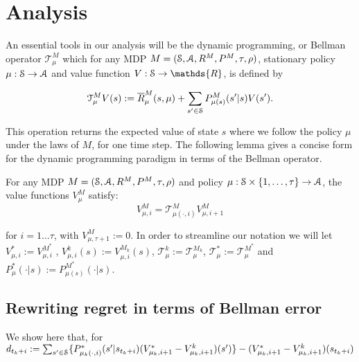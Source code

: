 \section{Analysis}

An essential tools in our analysis will be the dynamic programming, or Bellman operator $\mathcal{T}_{\mu}^{M}$ which for any MDP $M = (\mathcal{S}, \mathcal{A}, R^M, P^M, \tau, \rho)$, stationary policy $\mu:\mathcal{S} \rightarrow \mathcal{A}$ and value function $V:\states \rightarrow \mathds{R}$, is defined by

$$\mathcal{T}_{\mu}^{M} V(s) := \overline{R}_{\mu}^{M} (s, \mu) + \sum_{s' \in \mathcal{S}} P_{\mu(s)}^{M}(s' | s) V(s').$$

This operation returns the expected value of state $s$ where we follow the policy $\mu$ under the laws of $M$, for one time step. The following lemma gives a concise form for the dynamic programming paradigm in terms of the Bellman operator.
\begin{lemma}
\label{lem: DPl}
For any MDP $M = (\mathcal{S}, \mathcal{A}, R^M, P^M, \tau, \rho)$ and policy $\mu:\mathcal{S} \times \{1,\ldots,\tau\} \rightarrow \mathcal{A}$, the value functions $V^M_\mu$ satisfy:
\begin{equation}\label{eq: DP}
V_{\mu,i}^{M} = \mathcal{T}_{\mu(\cdot,i)}^M V_{\mu,i+1}^M
\end{equation}
\end{lemma}

for $i=1\dots \tau$, with $V_{\mu,\tau+1}^{M} := 0$. In order to streamline our notation we will let $V_{\mu,i}^* := V_{\mu,i}^{M^*}$ , $ V_{\mu,i}^k (s) := V_{\mu,i}^{M_k} (s)$, $\mathcal{T}_{\mu}^{k} := \mathcal{T}_{\mu}^{M_k} $, $\mathcal{T}_{\mu}^{*} := \mathcal{T}_{\mu}^{M^*} $ and  $P^*_\mu(\cdot | s) := P_{\mu(s)}^{M^*}(\cdot | s)$.


\subsection{Rewriting regret in terms of Bellman error}
\label{subsec: regret in terms of bellman error}
We show here that, for 
$d_{t_k+i} := \sum_{s' \in \mathcal{S}} \{P_{\mu_{k}(\cdot,i)}^{*}(s' \vert s_{t_k+i })(V_{\mu_{k},i+1}^{*}-V_{\mu_{k},i+1}^{k})(s') \} -(V_{\mu_{k},i+1}^{*}-V_{\mu_{k},i+1}^{k})(s_{t_k+i})$

